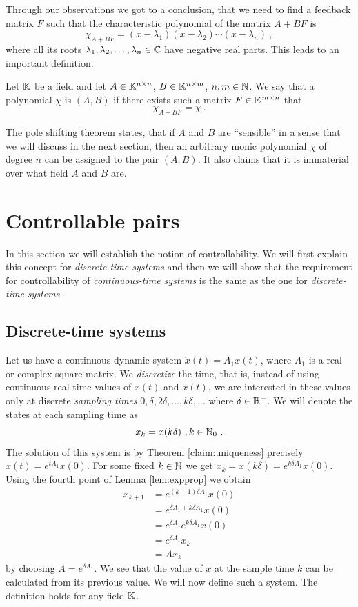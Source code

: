 Through our observations we got to a conclusion, that we need to find a feedback matrix $F$ such that the characteristic polynomial of the matrix $A+BF$ is $$\chi_{A+BF}=(x-\lambda_1)(x-\lambda_2)\cdots(x-\lambda_n)\ ,$$ where all its roots $\lambda_1,\lambda_2,\ldots,\lambda_n \in \mathbb{C}$ have negative real parts. This leads to an important definition.

\begin{definition}
    Let $\mathbb{K}$ be a field and let $A \in \mathbb{K}^{n \times n}$, $B \in \mathbb{K}^{n \times m}$, $n,m \in \mathbb{N}$. We say that a polynomial $\chi$ is  $(A,B)$ if there exists such a matrix $F\in\mathbb{K}^{m \times n}$ that $$\chi_{A+BF}=\chi\ .$$
\end{definition}

The pole shifting theorem states, that if $A$ and $B$ are ``sensible'' in a sense that we will discuss in the next section, then an arbitrary monic polynomial $\chi$ of degree $n$ can be assigned to the pair $(A,B)$. It also claims that it is immaterial over what field $A$ and $B$ are.

\section{Controllable pairs}

In this section we will establish the notion of controllability. We will first explain this concept for \textit{discrete-time systems} and then we will show that the requirement for controllability of \textit{continuous-time systems} is the same as the one for \textit{discrete-time systems}.

\subsection{Discrete-time systems}

Let us have a continuous dynamic system $\dot{x}(t)=A_1x(t)$, where $A_1$ is a real or complex square matrix. We \textit{discretize} the time, that is, instead of using continuous real-time values of $x(t)$ and $\dot{x}(t)$, we are interested in these values only at discrete \textit{sampling times} $0,\delta,2\delta,\ldots,k\delta,\ldots$ where $\delta\in\mathbb{R}^+$. We will denote the states at each sampling time as
$$x_k=x(k\delta)\ ,k\in\mathbb{N}_0\ .$$
The solution of this system is by Theorem \ref{claim:uniqueness} precisely $x(t)=e^{tA_1}x(0)$. For some fixed $k\in\mathbb{N}$ we get $x_k=x(k\delta)=e^{k\delta A_1}x(0)$. Using the fourth point of Lemma \ref{lem:expprop} we obtain 
\begin{align*}
	x_{k+1}
	&=e^{(k+1)\delta A_1}x(0) \\
	&=e^{\delta A_1 +k\delta A_1}x(0) \\
	&=e^{\delta A_1}e^{k\delta A_1}x(0) \\
	&=e^{\delta A_1}x_k \\
	&=Ax_k
\end{align*}
by choosing $A=e^{\delta A_1}$. We see that the value of $x$ at the sample time $k$ can be calculated from its previous value. We will now define such a system. The definition holds for any field $\mathbb{K}$.

